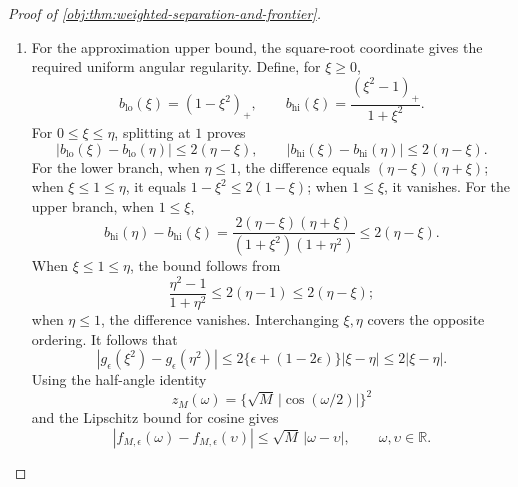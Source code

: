 \begin{proof}[Proof of \cref{obj:thm:weighted-separation-and-frontier}]
\begin{enumerate}
\[\]
The same mass, mean, and moment calculation used for the packet completion shows that
\[
\nu_0^{\mathrm{dual}}
=\sigma_-^{\mathrm{dual}}
 +(1-t_{\mathrm{dual}})\delta_{z_{\mathrm{dual}}^{\mathrm{comp}}},
\qquad
\nu_1^{\mathrm{dual}}
=\sigma_+^{\mathrm{dual}}
 +(1-t_{\mathrm{dual}})\delta_{z_{\mathrm{dual}}^{\mathrm{comp}}}
\]
form a pair in \(\mathfrak N_{K,M}\), with target gap \(\mathcal E\). Hence
\[
\mathcal E\le\Delta.
\]
The feasible set is nonempty, since \((\delta_1,\delta_1)\) is feasible. Its gaps are bounded by \(4e(0)\), by the polynomial residual bound above. Taking the polynomial infimum in that bound, followed by the feasible-pair supremum, therefore gives
\[
\Delta\le4\mathcal E.
\]

\item
For the approximation upper bound, the square-root coordinate gives the required uniform angular regularity. Define, for \(\xi\ge0\),
\[
b_{\mathrm{lo}}(\xi)=(1-\xi^2)_+,
\qquad
b_{\mathrm{hi}}(\xi)=\frac{(\xi^2-1)_+}{1+\xi^2}.
\]
For \(0\le\xi\le\eta\), splitting at \(1\) proves
\[
|b_{\mathrm{lo}}(\xi)-b_{\mathrm{lo}}(\eta)|
\le2(\eta-\xi),
\qquad
|b_{\mathrm{hi}}(\xi)-b_{\mathrm{hi}}(\eta)|
\le2(\eta-\xi).
\]
For the lower branch, when \(\eta\le1\), the difference equals
\((\eta-\xi)(\eta+\xi)\); when \(\xi\le1\le\eta\), it equals
\(1-\xi^2\le2(1-\xi)\); when \(1\le\xi\), it vanishes.
For the upper branch, when \(1\le\xi\),
\[
b_{\mathrm{hi}}(\eta)-b_{\mathrm{hi}}(\xi)
=\frac{2(\eta-\xi)(\eta+\xi)}
       {(1+\xi^2)(1+\eta^2)}
\le2(\eta-\xi).
\]
When \(\xi\le1\le\eta\), the bound follows from
\[
\frac{\eta^2-1}{1+\eta^2}\le2(\eta-1)\le2(\eta-\xi);
\]
when \(\eta\le1\), the difference vanishes. Interchanging \(\xi,\eta\) covers the opposite ordering. It follows that
\[
|g_\epsilon(\xi^2)-g_\epsilon(\eta^2)|
\le
2\{\epsilon+(1-2\epsilon)\}|\xi-\eta|
\le2|\xi-\eta|.
\]
Using the half-angle identity
\[
z_M(\omega)=\{\sqrt M\,|\cos(\omega/2)|\}^2
\]
and the Lipschitz bound for cosine gives
\[
|f_{M,\epsilon}(\omega)-f_{M,\epsilon}(\upsilon)|
\le\sqrt M\,|\omega-\upsilon|,
\qquad \omega,\upsilon\in\mathbb R.
\]


\end{enumerate}
\end{proof}
